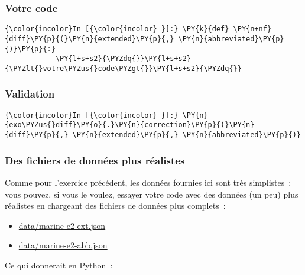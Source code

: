     \hypertarget{votre-code}{%
\subsubsection{Votre code}\label{votre-code}}

    \begin{Verbatim}[commandchars=\\\{\}]
{\color{incolor}In [{\color{incolor} }]:} \PY{k}{def} \PY{n+nf}{diff}\PY{p}{(}\PY{n}{extended}\PY{p}{,} \PY{n}{abbreviated}\PY{p}{)}\PY{p}{:}
            \PY{l+s+s2}{\PYZdq{}}\PY{l+s+s2}{\PYZlt{}votre\PYZus{}code\PYZgt{}}\PY{l+s+s2}{\PYZdq{}}
\end{Verbatim}


    \hypertarget{validation}{%
\subsubsection{Validation}\label{validation}}

    \begin{Verbatim}[commandchars=\\\{\}]
{\color{incolor}In [{\color{incolor} }]:} \PY{n}{exo\PYZus{}diff}\PY{o}{.}\PY{n}{correction}\PY{p}{(}\PY{n}{diff}\PY{p}{,} \PY{n}{extended}\PY{p}{,} \PY{n}{abbreviated}\PY{p}{)}
\end{Verbatim}


    \hypertarget{des-fichiers-de-donnuxe9es-plus-ruxe9alistes}{%
\subsubsection{Des fichiers de données plus
réalistes}\label{des-fichiers-de-donnuxe9es-plus-ruxe9alistes}}

    Comme pour l'exercice précédent, les données fournies ici sont très
simplistes~; vous pouvez, si vous le voulez, essayer votre code avec des
données (un peu) plus réalistes en chargeant des fichiers de données
plus complets~:

\begin{itemize}
	\item 
	\url{data/marine-e2-ext.json}
	\item
	\url{data/marine-e2-abb.json}
\end{itemize}

Ce qui donnerait en Python~:

